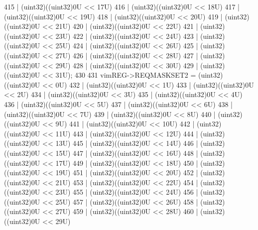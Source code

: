 \begin{DoxyCode}
415                         | (uint32)((uint32)0U << 17U)
416                         | (uint32)((uint32)0U << 18U)
417                         | (uint32)((uint32)0U << 19U)
418                         | (uint32)((uint32)0U << 20U)
419                         | (uint32)((uint32)0U << 21U)
420                         | (uint32)((uint32)0U << 22U)
421                         | (uint32)((uint32)0U << 23U)
422                         | (uint32)((uint32)0U << 24U)
423                         | (uint32)((uint32)0U << 25U)
424                         | (uint32)((uint32)0U << 26U)
425                         | (uint32)((uint32)0U << 27U)
426                         | (uint32)((uint32)0U << 28U)
427                         | (uint32)((uint32)0U << 29U)
428                         | (uint32)((uint32)0U << 30U)
429                         | (uint32)((uint32)0U << 31U);
430 
431     vimREG->REQMASKSET2 = (uint32)((uint32)0U << 0U)
432                         | (uint32)((uint32)0U << 1U)
433                         | (uint32)((uint32)0U << 2U)
434                         | (uint32)((uint32)0U << 3U)
435                         | (uint32)((uint32)0U << 4U)
436                         | (uint32)((uint32)0U << 5U)
437                         | (uint32)((uint32)0U << 6U)
438                         | (uint32)((uint32)0U << 7U)
439                         | (uint32)((uint32)0U << 8U)
440                         | (uint32)((uint32)0U << 9U)
441                         | (uint32)((uint32)0U << 10U)
442                         | (uint32)((uint32)0U << 11U)
443                         | (uint32)((uint32)0U << 12U)
444                         | (uint32)((uint32)0U << 13U)
445                         | (uint32)((uint32)0U << 14U)
446                         | (uint32)((uint32)0U << 15U)
447                         | (uint32)((uint32)0U << 16U)
448                         | (uint32)((uint32)0U << 17U)
449                         | (uint32)((uint32)0U << 18U)
450                         | (uint32)((uint32)0U << 19U)
451                         | (uint32)((uint32)0U << 20U)
452                         | (uint32)((uint32)0U << 21U)
453                         | (uint32)((uint32)0U << 22U)
454                         | (uint32)((uint32)0U << 23U)
455                         | (uint32)((uint32)0U << 24U)
456                         | (uint32)((uint32)0U << 25U)
457                         | (uint32)((uint32)0U << 26U)
458                         | (uint32)((uint32)0U << 27U)
459                         | (uint32)((uint32)0U << 28U)
460                         | (uint32)((uint32)0U << 29U)

\end{DoxyCode}
